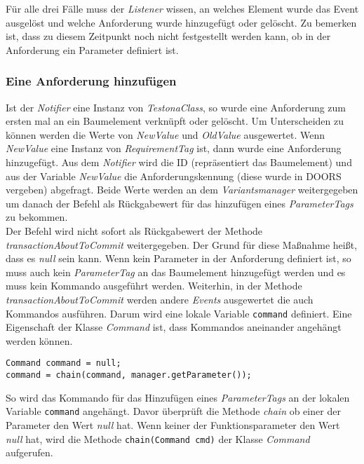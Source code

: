 Für alle drei Fälle muss der \textit{Listener} wissen, an welches Element wurde das Event ausgelöst und welche Anforderung wurde hinzugefügt oder gelöscht. Zu bemerken ist, dass zu diesem Zeitpunkt noch nicht festgestellt werden kann, ob in der Anforderung ein Parameter definiert ist.\\


\subsubsection{Eine Anforderung hinzufügen}
Ist der \textit{Notifier} eine Instanz von \textit{TestonaClass}, so wurde eine Anforderung zum ersten mal an ein Baumelement verknüpft oder gelöscht. Um Unterscheiden zu können werden die Werte von \textit{NewValue} und \textit{OldValue} ausgewertet. Wenn \textit{NewValue} eine Instanz von \textit{RequirementTag} ist, dann wurde eine Anforderung hinzugefügt. Aus dem \textit{Notifier} wird die ID (repräsentiert das Baumelement) und aus der Variable \textit{NewValue} die Anforderungskennung (diese wurde in DOORS vergeben) abgefragt. Beide Werte werden an dem \textit{Variantsmanager} weitergegeben um danach der Befehl als Rückgabewert für das hinzufügen eines \textit{ParameterTags} zu bekommen.\\


Der Befehl wird nicht sofort als Rückgabewert der Methode \textit{transactionAboutToCommit} weitergegeben. Der Grund für diese Maßnahme heißt, dass es \textit{null} sein kann. Wenn kein Parameter in der Anforderung definiert ist, so muss auch kein \textit{ParameterTag} an das Baumelement hinzugefügt werden und es muss kein Kommando ausgeführt werden. Weiterhin, in der Methode \textit{transactionAboutToCommit} werden andere \textit{Events} ausgewertet die auch Kommandos ausführen. Darum wird eine lokale Variable \texttt{command} definiert. Eine Eigenschaft der Klasse \textit{Command} ist, dass Kommandos aneinander angehängt werden können.

\begin{lstlisting}
Command command = null;
command = chain(command, manager.getParameter());
\end{lstlisting}

So wird das Kommando für das Hinzufügen eines \textit{ParameterTags} an der lokalen Variable \texttt{command} angehängt. Davor überprüft die Methode \textit{chain} ob einer der Parameter den Wert \textit{null} hat. Wenn keiner der Funktionsparameter den Wert \textit{null} hat, wird die Methode \texttt{chain(Command cmd)} der Klasse \textit{Command} aufgerufen.

